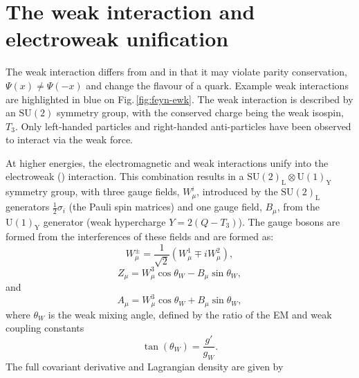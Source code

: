 \section{The weak interaction and electroweak unification}
\label{sec:EWK}

The weak interaction differs from \QED{} and \QCD{} in that it may violate parity conservation, $\Psi(x)\neq\Psi(-x)$ and change the flavour of a quark. 
Example weak interactions are highlighted in blue on Fig.\,\ref{fig:feyn-ewk}.
The weak interaction is described by an $\mathrm{SU(2)}$ symmetry group, with the conserved charge being the weak isospin, $T_{3}$.
Only left-handed particles and right-handed anti-particles have been observed to interact via the weak force. 

At higher energies, the electromagnetic and weak interactions unify into the electroweak (\EWK{}) interaction.
This combination results in a \ensuremath{\mathrm{SU(2)_{L}}\otimes\mathrm{U(1)_{Y}}} symmetry group, with three gauge fields, $W^{i}_{\mu}$, introduced by the $\mathrm{SU(2)_{L}}$ generators $\frac{1}{2}\sigma_{i}$ (the Pauli spin matrices) and one gauge field, $B_{\mu}$, from the $\mathrm{U(1)_{Y}}$ generator (weak hypercharge $Y = 2(Q-T_{3})$).
The \EWK{} gauge bosons are formed from the interferences of these fields and are formed as:
\begin{equation}
	W^{\pm}_{\mu} = \frac{1}{\sqrt{2}}(W^{1}_{\mu} \mp iW^{2}_{\mu}),
\end{equation}
\begin{equation}
	Z_{\mu} = W^{3}_{\mu}\cos{\theta_{W}} -  B_{\mu}\sin{\theta_{W}},
\end{equation}
and 
\begin{equation}
	A_{\mu} = W^{3}_{\mu}\cos{\theta_{W}} +  B_{\mu}\sin{\theta_{W}},
\end{equation}
where $\theta_{W}$ is the weak mixing angle, defined by the ratio of the EM and weak coupling constants 
\begin{equation}
	\tan(\theta_{W}) = \frac{g'}{g_{W}}.	
\end{equation}
The full \EWK{} covariant derivative and Lagrangian density are given by
